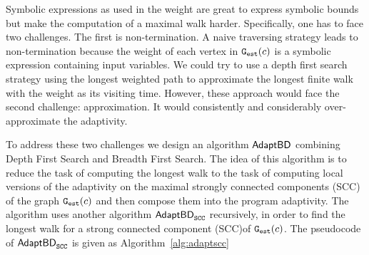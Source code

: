 Symbolic expressions as used in the weight  are great to express symbolic bounds but make the computation of 
a maximal walk harder. Specifically, one has to face two challenges. The first is non-termination.
A naive traversing strategy leads to non-termination
because the weight of each vertex in $\mathtt{{G_{est}}}({c})$
is a symbolic expression containing input variables.
We could try to use a depth first search strategy
using the longest weighted path to approximate
the longest finite walk with the weight as
its visiting time. However, these approach would face the second challenge: approximation.
It would consistently and considerably over-approximate the adaptivity.

To address these two challenges we design an algorithm $\mathsf{AdaptBD}$  combining 
Depth First Search and Breadth First Search.
The idea of this algorithm is to reduce the task of computing the longest walk to the task of computing local versions of the adaptivity on the maximal strongly connected components (SCC) of the graph $\mathtt{{G_{est}}}(c)$ and then compose them into the program adaptivity. The algorithm  uses  
another algorithm $\mathsf{AdaptBD}_{\mathtt{SCC}}$  recursively, in order to  find the longest walk for a strong connected component (SCC)of $\mathtt{{G_{est}}}(c)$. The pseudocode of $\mathsf{AdaptBD}_{\mathtt{SCC}}$ is given as Algorithm~\ref{alg:adaptscc}

